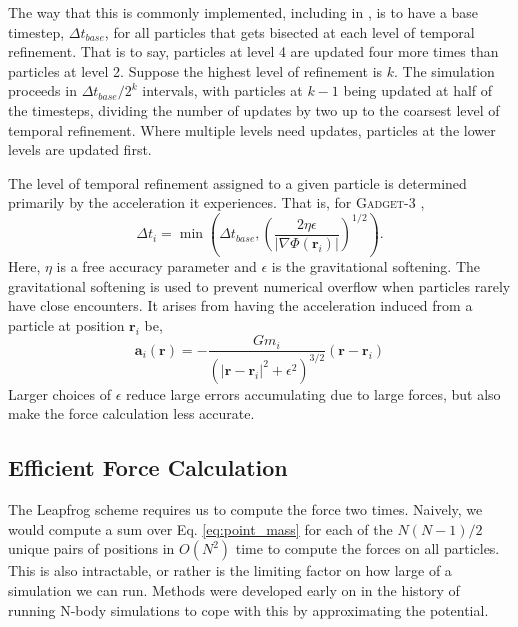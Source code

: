 The way that this is commonly implemented, including in \citet{GadgetCodePaper}, is to have a base timestep, $\Delta t_{base}$, for all particles that gets bisected at each level of temporal refinement. That is to say, particles at level 4 are updated four more times than particles at level 2. Suppose the highest level of refinement is $k$. The simulation proceeds in $\Delta t_{base} / 2^{k}$ intervals, with particles at $k - 1$ being updated at half of the timesteps, dividing the number of updates by two up to the coarsest level of temporal refinement. Where multiple levels need updates, particles at the lower levels are updated first.

The level of temporal refinement assigned to a given particle is determined primarily by the acceleration it experiences. That is, for \textsc{Gadget-3} \citep{GadgetCodePaper},
\begin{equation}
\Delta t_i = \min\left(\Delta t_{base}, \left(\frac{2 \eta \epsilon}{\vert \nabla \Phi(\textbf{r}_i) \vert} \right)^{1/2}\right).
\end{equation}
Here, $\eta$ is a free accuracy parameter and $\epsilon$ is the gravitational softening. The gravitational softening is used to prevent numerical overflow when particles rarely have close encounters. It arises from having the acceleration induced from a particle at position $\textbf{r}_i$  be,
\begin{equation}
\textbf{a}_i(\textbf{r}) = -\frac{G m_i}{\left(\vert\textbf{r} - \textbf{r}_i\vert^2 + \epsilon^2\right)^{3/2}}(\textbf{r} - \textbf{r}_i) \label{eq:point_mass}
\end{equation}
Larger choices of $\epsilon$ reduce large errors accumulating due to large forces, but also make the force calculation less accurate.

\subsection{Efficient Force Calculation}

The Leapfrog scheme requires us to compute the force two times. Naively, we would compute a sum over Eq. \eqref{eq:point_mass} for each of the $N(N-1)/2$ unique pairs of positions in $O(N^2)$ time to compute the forces on all particles. This is also intractable, or rather is the limiting factor on how large of a simulation we can run. Methods were developed early on in the history of running N-body simulations to cope with this by approximating the potential.

